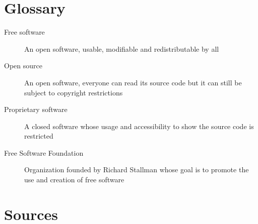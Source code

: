 \documentclass[12pt]{article}
\begin{document}
\section*{Glossary}

\begin{description}
  \item[Free software]{An open software, usable, modifiable and redistributable by all}
  \item[Open source]{An open software, everyone can read its source code but it can still be subject to copyright restrictions}
  \item[Proprietary software]{A closed software whose usage and accessibility to show the source code is restricted}
  \item[Free Software Foundation]{Organization founded by Richard Stallman whose goal is to promote the use and creation of free software}
\end{description}

\section*{Sources}



\end{document}
